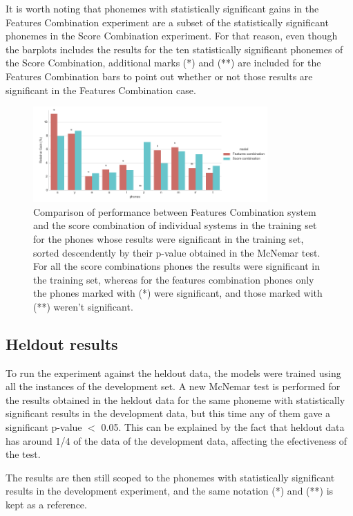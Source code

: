 It is worth noting that phonemes with statistically significant gains in the Features
Combination experiment are a subset of the statistically significant phonemes in the
Score Combination experiment. For that reason, even though the barplots includes
the results for the ten statistically significant phonemes of the Score Combination,
additional marks (*) and (**) are included for the Features Combination bars to
point out whether or not those results are significant in the Features Combination
case.

\begin{figure}[H]
	\centering
	\includegraphics[width=0.8\textwidth]{files/figures/results/relatives/relatives-fusion-systems-dev-mcnemar.png}
	\caption{Comparison of performance between Features Combination system and the score combination
	of individual systems in the training set for the phones whose results were significant
	in the training set, sorted descendently by their p-value obtained in the McNemar test.
	For all the score combinations phones the results were significant in the training set,
	whereas for the features combination phones only the phones marked with (*) were significant,
	and those marked with (**) weren't significant.}
	\label{fig:fusionMcnemarDev}
\end{figure}

\subsection{Heldout results}

To run the experiment against the heldout data, the models were trained using all the
instances of the development set. A new McNemar test is performed for the results obtained
in the heldout data for the same phoneme with statistically significant results in the
development data, but this time any of them gave a significant p-value $<$ 0.05.
This can be explained by the fact that heldout data has around 1/4 of the data of the
development data, affecting the efectiveness of the test.

The results are then still scoped to the phonemes with statistically significant results
in the development experiment, and the same notation (*) and (**) is kept as a reference.

